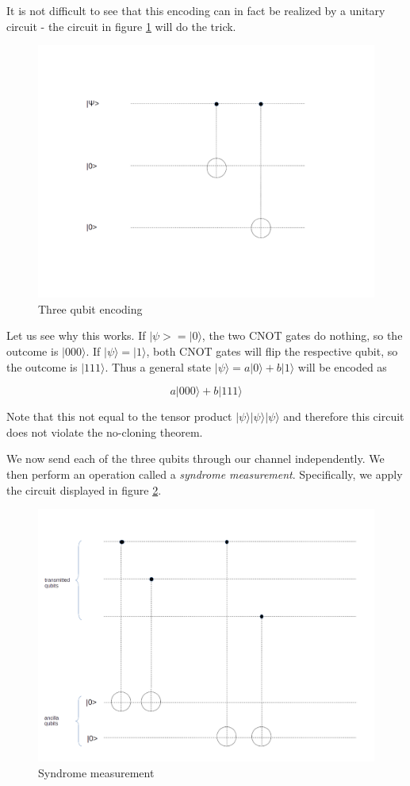 \documentclass[a4paper, draft]{article}
\theoremstyle{own}
\theoremstyle{remark}
\begin{document}
It is not difficult to see that this encoding can in fact be realized by a unitary circuit - the circuit in figure \ref{fig:ThreeBitCode} will do the trick.

\begin{figure}
\centering
\includegraphics[width=1.0\linewidth]{images/ThreeBitCode}
\caption[Three qubit encoding]{Three qubit encoding}
\label{fig:ThreeBitCode}
\end{figure}


Let us see why this works. If $|\psi > = |0 \rangle$, the two CNOT gates do nothing, so the outcome is $|000 \rangle$. If $|\psi \rangle = |1\rangle$, both CNOT gates will flip the respective qubit, so the outcome is $|111\rangle$. Thus a general state $|\psi \rangle = a|0 \rangle + b|1\rangle$ will be encoded as

$$
a |000 \rangle + b |111 \rangle
$$

Note that this not equal to the tensor product $|\psi \rangle  |\psi \rangle |\psi \rangle$ and therefore this circuit does not violate the no-cloning theorem. 

We now send each of the three qubits through our channel independently. We then perform an operation called a {\em syndrome measurement}. Specifically, we apply the circuit displayed in figure \ref{fig:SyndromeMeasurement}.

\begin{figure}
\centering
\includegraphics[width=0.7\linewidth]{images/SyndromeMeasurement}
\caption[Syndrome measurement]{Syndrome measurement}
\label{fig:SyndromeMeasurement}
\end{figure}
\end{document}
